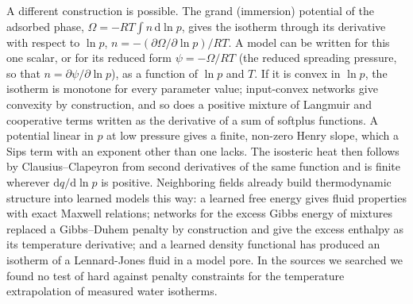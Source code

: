 \documentclass[journal=jcisd8,manuscript=article]{achemso}
\begin{document}
A different construction is possible. The grand (immersion) potential of the adsorbed phase,
$\Omega = -RT\int n\,\mathrm{d}\ln p$, gives the isotherm through its derivative with respect to $\ln p$,
$n = -(\partial\Omega/\partial\ln p)/RT$\cite{myers2002,coudert2008}. A model can be written for this one scalar, or
for its reduced form $\psi = -\Omega/RT$ (the reduced spreading pressure, so that $n = \partial\psi/\partial\ln p$), as a
function of $\ln p$ and $T$. If it is convex in $\ln p$, the isotherm is monotone for every parameter value; input-convex
networks give convexity by construction\cite{amos2017}, and so does a positive mixture of Langmuir and cooperative
terms written as the derivative of a sum of softplus functions. A potential linear in $p$ at low pressure gives a
finite, non-zero Henry slope, which a Sips term with an exponent other than one lacks\cite{siperstein2021}. The
isosteric heat then follows by Clausius--Clapeyron from second derivatives of the same function and is finite wherever
$\mathrm{d}q/\mathrm{d}\ln p$ is positive. Neighboring fields already build thermodynamic structure into learned
models this way: a learned free energy gives fluid properties with exact Maxwell relations\cite{rosenberger2022};
networks for the excess Gibbs energy of mixtures replaced a Gibbs--Duhem penalty by
construction\cite{rittig2023,rittig2024,specht2024} and give the excess enthalpy as its temperature derivative\cite{hoffmann2026}; and a learned
density functional has produced an isotherm of a Lennard-Jones fluid in a model pore\cite{cheng2026}. In the sources we
searched we found no test of hard against penalty constraints for the temperature extrapolation of measured water
isotherms.
\end{document}
